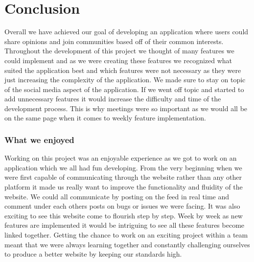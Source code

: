 \chapter{Conclusion}
Overall we have achieved our goal of developing an application where users could share opinions and join communities based off of their common interests. Throughout the development of this project we thought of many features we could implement and as we were creating these features we recognized what suited the application best and which features were not necessary as they were just increasing the complexity of the application. We made sure to stay on topic of the social media aspect of the application. If we went off topic and started to add unnecessary features it would increase the difficulty and time of the development process. This is why meetings were so important as we would all be on the same page when it comes to weekly feature implementation. 

\subsection{What we enjoyed}
Working on this project was an enjoyable experience as we got to work on an application which we all had fun developing. From the very beginning when we were first capable of communicating through the website rather than any other platform it made us really want to improve the functionality and fluidity of the website. We could all communicate by posting on the feed in real time and comment under each others posts on bugs or issues we were facing. It was also exciting to see this website come to flourish step by step. Week by week as new features are implemented it would be intriguing to see all these features become linked together. Getting the chance to work on an exciting project within a team meant that we were always learning together and constantly challenging ourselves to produce a better website by keeping our standards high.

